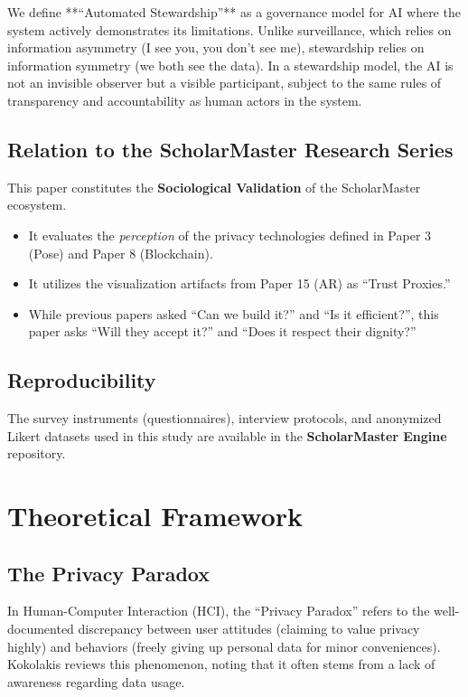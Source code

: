 \documentclass[conference]{IEEEtran}
\begin{document}
We define **``Automated Stewardship''** as a governance model for AI where the system actively demonstrates its limitations. Unlike surveillance, which relies on information asymmetry (I see you, you don't see me), stewardship relies on information symmetry (we both see the data). In a stewardship model, the AI is not an invisible observer but a visible participant, subject to the same rules of transparency and accountability as human actors in the system.

\subsection{Relation to the ScholarMaster Research Series}
This paper constitutes the \textbf{Sociological Validation} of the ScholarMaster ecosystem.
\begin{itemize}
    \item It evaluates the \textit{perception} of the privacy technologies defined in Paper 3 (Pose) and Paper 8 (Blockchain).
    \item It utilizes the visualization artifacts from Paper 15 (AR) as ``Trust Proxies.''
    \item While previous papers asked ``Can we build it?'' and ``Is it efficient?'', this paper asks ``Will they accept it?'' and ``Does it respect their dignity?''
\end{itemize}

\subsection{Reproducibility}
The survey instruments (questionnaires), interview protocols, and anonymized Likert datasets used in this study are available in the \textbf{ScholarMaster Engine} repository.

\section{Theoretical Framework}

\subsection{The Privacy Paradox}
In Human-Computer Interaction (HCI), the ``Privacy Paradox'' refers to the well-documented discrepancy between user attitudes (claiming to value privacy highly) and behaviors (freely giving up personal data for minor conveniences). Kokolakis \cite{b3} reviews this phenomenon, noting that it often stems from a lack of awareness regarding data usage.
\end{document}
